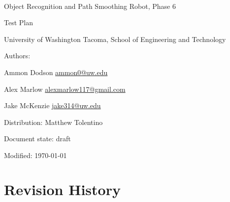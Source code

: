\documentclass[english,12pt]{article}
\begin{document}
\begin{center}

\thispagestyle{empty}

$ $

\vspace{250pt}

\begin{bfseries}

{\Large Object Recognition and Path Smoothing Robot, Phase 6}

{\Huge Test Plan}


\end{bfseries}

\vspace{180pt}

University of Washington Tacoma, School of Engineering and Technology


\vspace{12pt}

Authors: 

Ammon Dodson \href{mailto:ammon0@uw.edu}{ammon0@uw.edu} 

Alex Marlow \href{mailto:alexmarlow117@gmail.com}{alexmarlow117@gmail.com} 

Jake McKenzie \href{mailto:jake314@uw.edu}{jake314@uw.edu}

Distribution: Matthew Tolentino

Document state: draft

Modified: \today

\end{center}

\newpage


\tableofcontents

\newpage


\section{Revision History}
\end{document}
